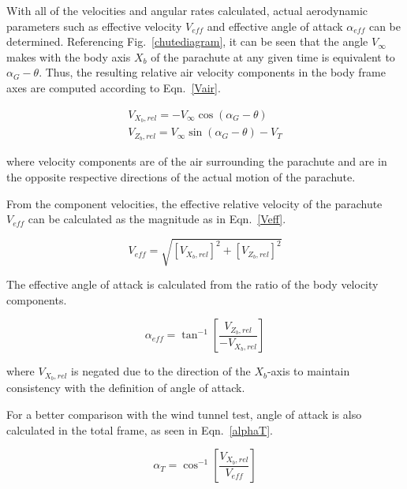 \documentclass[]{aiaa-tc}%
\begin{document}
With all of the velocities and angular rates calculated, actual aerodynamic parameters such as effective velocity $V_{eff}$ and effective angle of attack $\alpha_{eff}$ can be determined.  Referencing Fig.~\ref{chutediagram}, it can be seen that the angle $V_{\infty}$ makes with the body axis $X_b$ of the parachute at any given time is equivalent to $\alpha_G - \theta$.  Thus, the resulting relative air velocity components in the body frame axes are computed according to Eqn.~\ref{Vair}.

\begin{equation} \label{Vair}
\begin{gathered}
V_{X_b,rel} = -V_{\infty}\cos(\alpha_G - \theta) \\
V_{Z_b,rel} = V_{\infty}\sin(\alpha_G - \theta) - V_T
\end{gathered}
\end{equation}

\noindent where velocity components are of the air surrounding the parachute and are in the opposite respective directions of the actual motion of the parachute.

From the component velocities, the effective relative velocity of the parachute $V_{eff}$ can be calculated as the magnitude as in Eqn.~\ref{Veff}.


\newcommand\Vxb{V_{X_b,rel}}
\newcommand\Vzb{V_{Z_b,rel}}

\begin{equation} \label{Veff}
V_{eff} = \sqrt{\left[\Vxb      \right]^2
              + \left[\Vzb \right]^2}
\end{equation}

The effective angle of attack is calculated from the ratio of the body velocity components.

\begin{equation} \label{Aeff}
\alpha_{eff} = \tan^{-1} \left[ \frac{\Vzb}{-\Vxb} \right]
\end{equation}

\noindent where $V_{X_b,rel}$ is negated due to the direction of the $X_b$-axis to maintain consistency with the definition of angle of attack.

For a better comparison with the wind tunnel test, angle of attack is also calculated in the total frame, as seen in Eqn.~\ref{alphaT}.

\begin{equation} \label{alphaT}
 \alpha_{T} = \cos^{-1} \left[ \frac{\Vxb}{V_{eff}} \right]
\end{equation}
\end{document}
